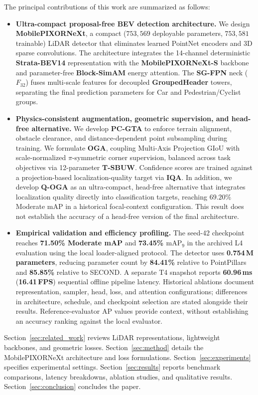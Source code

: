 The principal contributions of this work are summarized as follows:
\begin{itemize}
    \item \textbf{Ultra-compact proposal-free BEV detection architecture.} We design \textbf{MobilePIXORNeXt}, a compact ($753{,}569$ deployable parameters, $753{,}581$ trainable) LiDAR detector that eliminates learned PointNet encoders and 3D sparse convolutions. The architecture integrates the 14-channel deterministic \textbf{Strata-BEV14} representation with the \textbf{MobilePIXORNeXt-S} backbone and parameter-free \textbf{Block-SimAM} energy attention. The \textbf{SG-FPN} neck ($F_{32}$) fuses multi-scale features for decoupled \textbf{GroupedHeader} towers, separating the final prediction parameters for Car and Pedestrian/Cyclist groups.
    
    \item \textbf{Physics-consistent augmentation, geometric supervision, and head-free alternative.} We develop \textbf{PC-GTA} to enforce terrain alignment, obstacle clearance, and distance-dependent point subsampling during training. We formulate \textbf{OGA}, coupling Multi-Axis Projection GIoU with scale-normalized $\pi$-symmetric corner supervision, balanced across task objectives via 12-parameter \textbf{T-SBUW}. Confidence scores are trained against a projection-based localization-quality target via \textbf{IQA}. In addition, we develop \textbf{Q-OGA} as an ultra-compact, head-free alternative that integrates localization quality directly into classification targets, reaching $69.20\%$ Moderate mAP in a historical focal-context configuration. This result does not establish the accuracy of a head-free version of the final architecture.
    
    \item \textbf{Empirical validation and efficiency profiling.} The seed-42 checkpoint reaches \textbf{71.50\% Moderate mAP} and \textbf{73.45\% $\text{mAP}_9$} in the archived L4 evaluation using the local loader-aligned protocol. The detector uses \textbf{0.754\,M parameters}, reducing parameter count by \textbf{84.41\%} relative to PointPillars and \textbf{85.85\%} relative to SECOND. A separate T4 snapshot reports \textbf{60.96\,ms} (\textbf{16.41\,FPS}) sequential offline pipeline latency. Historical ablations document representation, sampler, head, loss, and attention configurations; differences in architecture, schedule, and checkpoint selection are stated alongside their results. Reference-evaluator AP values provide context, without establishing an accuracy ranking against the local evaluator.
\end{itemize}

Section~\ref{sec:related_work} reviews LiDAR representations, lightweight backbones, and geometric losses. Section~\ref{sec:method} details the MobilePIXORNeXt architecture and loss formulations. Section~\ref{sec:experiments} specifies experimental settings. Section~\ref{sec:results} reports benchmark comparisons, latency breakdowns, ablation studies, and qualitative results. Section~\ref{sec:conclusion} concludes the paper.
